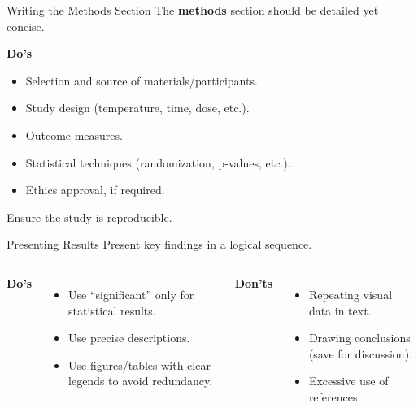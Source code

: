 \begin{frame}{Writing the Methods Section}
  The \textbf{methods} section should be detailed yet concise.
  \pause

  \textbf{Do's}
  \begin{itemize}
    \item Selection and source of materials/participants.
    \item Study design (temperature, time, dose, etc.).
    \item Outcome measures.
    \item Statistical techniques (randomization, p-values, etc.).
    \item Ethics approval, if required.
  \end{itemize}
  \pause
  Ensure the study is reproducible.
\end{frame}

\begin{frame}{Presenting Results}
  Present key findings in a logical sequence.
  \vspace{0.5cm}
  \pause

  \begin{columns}
    \textbf{Do's}
    \begin{itemize}
      \item Use “significant” only for statistical results.
      \item Use precise descriptions.
      \item Use figures/tables with clear legends to avoid redundancy.
    \end{itemize}
    \pause
    \alert{\textbf{Don'ts}}
    \begin{itemize}
      \item Repeating visual data in text.
      \item Drawing conclusions (save for discussion).
      \item Excessive use of references.
    \end{itemize}
  \end{columns}
\end{frame}


